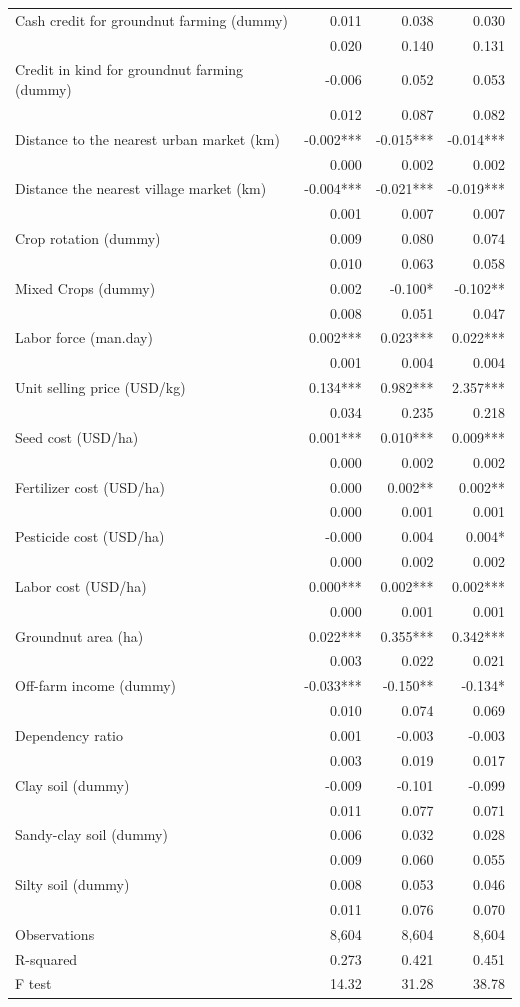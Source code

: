 \documentclass[
]{article}
\begin{document}
\begin{longtable}[t]{lrrr}
Cash credit for groundnut farming (dummy) & 0.011 & 0.038 & 0.030\\
 & 0.020 & 0.140 & 0.131\\
Credit in kind for groundnut farming (dummy) & -0.006 & 0.052 & 0.053\\
 & 0.012 & 0.087 & 0.082\\
Distance to the nearest urban market (km) & -0.002*** & -0.015*** & -0.014***\\
 & 0.000 & 0.002 & 0.002\\
Distance the nearest village market (km) & -0.004*** & -0.021*** & -0.019***\\
 & 0.001 & 0.007 & 0.007\\
Crop rotation (dummy) & 0.009 & 0.080 & 0.074\\
 & 0.010 & 0.063 & 0.058\\
Mixed Crops (dummy) & 0.002 & -0.100* & -0.102**\\
 & 0.008 & 0.051 & 0.047\\
Labor force (man.day) & 0.002*** & 0.023*** & 0.022***\\
 & 0.001 & 0.004 & 0.004\\
Unit selling price (USD/kg) & 0.134*** & 0.982*** & 2.357***\\
 & 0.034 & 0.235 & 0.218\\
Seed cost (USD/ha) & 0.001*** & 0.010*** & 0.009***\\
 & 0.000 & 0.002 & 0.002\\
Fertilizer cost (USD/ha) & 0.000 & 0.002** & 0.002**\\
 & 0.000 & 0.001 & 0.001\\
Pesticide cost (USD/ha) & -0.000 & 0.004 & 0.004*\\
 & 0.000 & 0.002 & 0.002\\
Labor cost (USD/ha) & 0.000*** & 0.002*** & 0.002***\\
 & 0.000 & 0.001 & 0.001\\
Groundnut area (ha) & 0.022*** & 0.355*** & 0.342***\\
 & 0.003 & 0.022 & 0.021\\
Off-farm income (dummy) & -0.033*** & -0.150** & -0.134*\\
 & 0.010 & 0.074 & 0.069\\
Dependency ratio & 0.001 & -0.003 & -0.003\\
 & 0.003 & 0.019 & 0.017\\
Clay soil (dummy) & -0.009 & -0.101 & -0.099\\
 & 0.011 & 0.077 & 0.071\\
Sandy-clay soil (dummy) & 0.006 & 0.032 & 0.028\\
 & 0.009 & 0.060 & 0.055\\
Silty soil (dummy) & 0.008 & 0.053 & 0.046\\
 & 0.011 & 0.076 & 0.070\\
Observations & 8,604 & 8,604 & 8,604\\
R-squared & 0.273 & 0.421 & 0.451\\
F test & 14.32 & 31.28 & 38.78\\*
\end{longtable}
\endgroup{}
\end{document}
